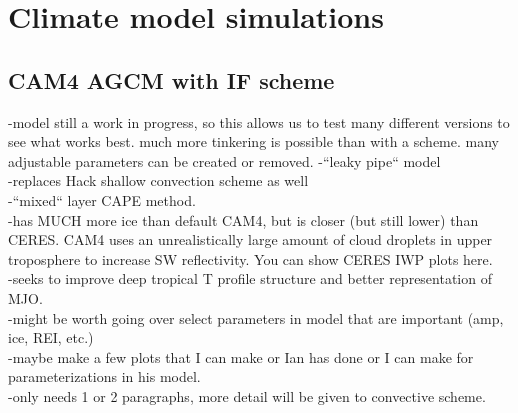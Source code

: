 \documentclass[letterpaper,12pt,titlepage,oneside,final]{book}
\begin{document}
\chapter{Climate model simulations}
\section{CAM4 AGCM with IF scheme}

-model still a work in progress, so this allows us to test many different versions to see what works best. much more tinkering is possible than with a scheme. many adjustable parameters can be created or removed.
-``leaky pipe`` model
\\
-replaces Hack shallow convection scheme as well
\\
-``mixed`` layer CAPE method.
\\
-has MUCH more ice than default CAM4, but is closer (but still lower) than CERES. CAM4 uses an unrealistically large amount of cloud droplets in upper troposphere to increase SW reflectivity. You can show CERES IWP plots here.
\\
-seeks to improve deep tropical T profile structure and better representation of MJO.
\\
-might be worth going over select parameters in model that are important (amp, ice, REI, etc.)
\\
-maybe make a few plots that I can make or Ian has done or I can make for parameterizations in his model.
\\

-only needs 1 or 2 paragraphs, more detail will be given to convective scheme.
\end{document}
